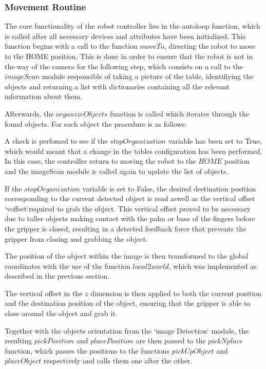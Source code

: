 \subsubsection{Movement Routine}

The core functionality of the robot controller lies in the autoloop function, which is called after all necessary devices and attributes have been initialized. This function begins with a call to the function \(moveTo\), directing the robot to move to the HOME position.  This is done in order to ensure that the robot is not in the way of the camera for the following step, which consists on a call to the \(imageScan\) module responsible of taking a picture of the table, identifiying the objects and returning a list with dictionaries containing all the relevant information about them.

Afterwards, the \(organizeObjects\) function is called which iterates through the found objects. For each object the procedure is as follows: 

A check is perfomed to see if the \(stopOrganization\) variable has been set to True, which would meant that a change in the tables configuration has been performed. In this case, the controller return to moving the robot to the \(HOME\) position and the imageScan module is called again to update the list of objects. 

If the \(stopOrganization\) variable is set to False, the desired destination position corresponding to the current detected object is read aswell as the vertical offset `voffset`required to grab the object. This vertical offset proved to be necessary due to taller objects making contact with the palm or base of the fingers before the gripper is closed, resulting in a detected feedback force that prevents the gripper from closing and grabbing the object. 

The position of the object within the image is then transformed to the global coordinates with the use of the function \(local2world\), which was implemented as described in the previous section.

The vertical offset in the \(z\) dimension is then  applied to both the current position and the destination position of the object, ensuring that the gripper is able to close around the object and grab it. 

Together with the objects orientation from the `image Detection` module, the resulting \(pickPosition\) and \(placePosition\) are then passed  to the \(pickNplace\) function,  which passes the positions to the functions \(pickUpObject\) and \(placeObject\) respectively and calls them one after the other.



